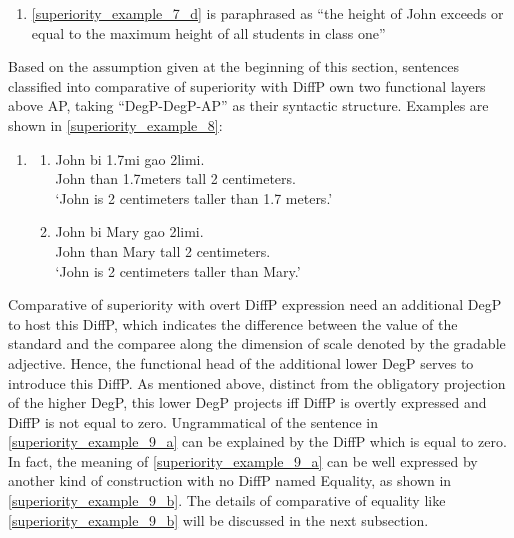 \documentclass{ctexart}
\begin{document}
\begin{enumerate}
\begin{enumerate}
        \item \label{superiority_example_7_e}
        \ref{superiority_example_7_d} is paraphrased as ``the height of John exceeds or equal to the  maximum height of all students in class one''

    \end{enumerate}
\end{enumerate}

Based on the assumption given at the beginning of this section, sentences classified into comparative of superiority with DiffP own two functional layers above AP, taking ``DegP-DegP-AP'' as their syntactic structure. Examples are shown in \ref{superiority_example_8}:

\begin{enumerate}
    \item \label{superiority_example_8}
    \begin{enumerate}
        \item \label{superiority_example_8_a}
        John bi 1.7mi gao 2limi. \\
        John than 1.7meters tall 2 centimeters. \\
        `John is 2 centimeters taller than 1.7 meters.'

        \item \label{superiority_example_8_b}
        John bi Mary gao 2limi. \\
        John than Mary tall 2 centimeters.  \\
        `John is 2 centimeters taller than Mary.'

    \end{enumerate}
\end{enumerate}

Comparative of superiority with overt DiffP expression need an additional DegP to host this DiffP, which indicates the difference between the value of the standard and the comparee along the dimension of scale denoted by the gradable adjective. Hence, the functional head of the additional lower DegP serves to introduce this DiffP. As mentioned above, distinct from the obligatory projection of the higher DegP, this lower DegP projects iff DiffP is overtly expressed and DiffP is not equal to zero. Ungrammatical of the sentence in \ref{superiority_example_9_a} can be explained by the DiffP which is equal to zero. In fact, the meaning of \ref{superiority_example_9_a} can be well expressed by another kind of construction with no DiffP named Equality, as shown in \ref{superiority_example_9_b}. The details of comparative of equality like \ref{superiority_example_9_b} will be discussed in the next subsection.
\end{document}
